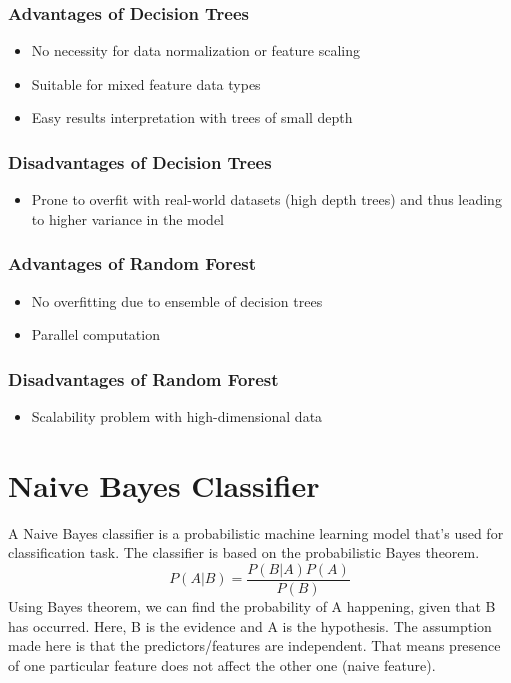 \documentclass{article}
\begin{document}
\subsubsection{Advantages of Decision Trees}
\begin{itemize}
	\item No necessity for data normalization or feature scaling
	\item Suitable for mixed feature data types
	\item Easy results interpretation with trees of small depth
\end{itemize}
\subsubsection{Disadvantages of Decision Trees}
\begin{itemize}
	\item Prone to overfit with real-world datasets (high depth trees) and thus leading to higher variance in the model
\end{itemize}

\subsubsection{Advantages of Random Forest}
\begin{itemize}
	\item No overfitting due to ensemble of decision trees
	\item Parallel computation
\end{itemize}
\subsubsection{Disadvantages of Random Forest}
\begin{itemize}
	\item Scalability problem with high-dimensional data
\end{itemize}

\section{Naive Bayes Classifier}
A Naive Bayes classifier is a probabilistic machine learning model that’s used for classification task. The classifier is based on the probabilistic Bayes theorem.
\begin{equation}
\label{eq:bayes-theorem}
P(A|B) = \frac{P(B|A) P(A)}{P(B)}
\end{equation}
Using Bayes theorem, we can find the probability of A happening, given that B has occurred. Here, B is the evidence and A is the hypothesis. The assumption made here is that the predictors/features are independent. That means presence of one particular feature does not affect the other one (naive feature).
\end{document}
